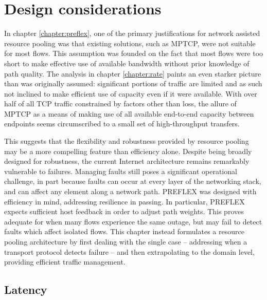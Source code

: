 \section{Design considerations}
\label{section:inflex:design}

In chapter \ref{chapter:preflex}, one of the primary justifications for network assisted resource pooling was that existing solutions, such as \ac{MPTCP}, were not suitable for most flows. 
This assumption was founded on the fact that most flows were too short to make effective use of available bandwidth without prior knowledge of path quality.
The analysis in chapter \ref{chapter:rate} paints an even starker picture than was originally assumed: significant portions of traffic are limited and as such not inclined to make efficient use of capacity even if it were available.
With over half of all \ac{TCP} traffic constrained by factors other than loss, the allure of \ac{MPTCP} as a means of making use of all available end-to-end capacity between endpoints seems circumscribed to a small set of high-throughput transfers.

This suggests that the flexibility and robustness provided by resource pooling may be a more compelling feature than efficiency alone.
Despite being broadly designed for robustness, the current Internet architecture remains remarkably vulnerable to failures.
Managing faults still poses a significant operational challenge, in part because faults can occur at every layer of the networking stack, and can affect any element along a network path. 
\ac{PREFLEX} was designed with efficiency in mind, addressing resilience in passing.
In particular, \ac{PREFLEX} expects sufficient host feedback in order to adjust path weights.
This proves adequate for when many flows experience the same outage, but may fail to detect faults which affect isolated flows.
This chapter instead formulates a resource pooling architecture by first dealing with the single case -- addressing when a transport protocol detects failure -- and then extrapolating to the domain level, providing efficient traffic management.

\subsection{Latency}

